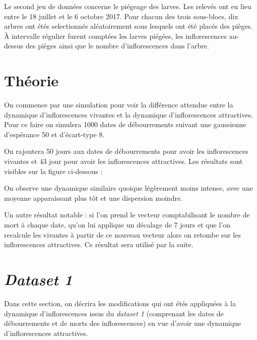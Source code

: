 \documentclass[a4paper, 11pt]{article}
\begin{document}
Le second jeu de données concerne le piégeage des larves. Les relevés ont eu lieu entre le 18 juillet et le 6 octobre 2017. Pour chacun des trois sous-blocs, dix arbres ont étés selectionnés aléatoirement sous lesquels ont été placés des pièges. À intervalle régulier furent comptées les larves piégées, les inflorescences au-dessus des pièges ainsi que le nombre d'inflorescences dans l'arbre.

\section{Théorie}

On commence par une simulation pour voir la différence attendue entre la dynamique d'inflorescences vivantes et la dynamique d'inflorescences attractives. Pour ce faire on simulera 1000 dates de débourrements suivant une gaussienne d'espérance 50 et d'écart-type 8.

On rajoutera 50 jours aux dates de débourrements pour avoir les inflorescences vivantes et 43 jour pour avoir les inflorescences attractives. Les résultats sont visibles sur la figure ci-dessous : 

\begin{figure}[h]
 \centering
\end{figure}


On observe une dynamique similaire quoique légèrement moins intense, avec une moyenne apparaissant plus tôt et une dispersion moindre.

Un autre résultat notable : si l'on prend le vecteur comptabilisant le nombre de mort à chaque date, qu'on lui applique un décalage de 7 jours et que l'on recalcule les vivantes à partir de ce nouveau vecteur alors on retombe sur les inflorescences attractives.
Ce résultat sera utilisé par la suite.

\section{\textit{Dataset 1}}

Dans cette section, on décrira les modifications qui ont étés appliquées à la dynamique d'inflorescences issus du \textit{dataset 1} (comprenant les dates de débourrements et de morts des inflorescences) en vue d'avoir une dynamique d'inflorescences attractives.
\end{document}
